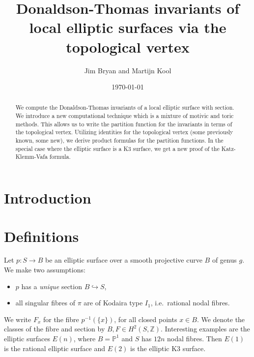 \documentclass{amsart}
\title{Donaldson-Thomas invariants of local elliptic surfaces via the topological vertex}
\author{Jim Bryan and Martijn Kool}
\date{\today}
\theoremstyle{definition}
\newcommand{\ZZ} {\mathbb{Z}}		%
\newcommand{\PP} {\mathbb{P}}
\begin{document}
\begin{abstract}

We compute the Donaldson-Thomas invariants of a local elliptic surface
with section. We introduce a new computational technique which is a
mixture of motivic and toric methods. This allows us to write the
partition function for the invariants in terms of the topological
vertex. Utilizing identities for the topological vertex (some
previously known, some new), we derive product formulas for the
partition functions. In the special case where the elliptic surface is
a K3 surface, we get a new proof of the Katz-Klemm-Vafa formula.
\end{abstract}

\maketitle 





\section{Introduction}

\section{Definitions}

Let $p : S \rightarrow B$ be an elliptic surface over a smooth projective curve $B$ of genus $g$. We make two assumptions:
\begin{itemize}
\item $p$ has a \emph{unique} section $B \hookrightarrow S$,
\item all singular fibres of $\pi$ are of Kodaira type $I_1$, i.e.~rational nodal fibres. 
\end{itemize}
We write $F_x$ for the fibre $p^{-1}(\{x\})$, for all closed points $x \in B$. We denote the classes of the fibre and section by $B, F \in H^2(S,\ZZ)$. Interesting examples are the elliptic surfaces $E(n)$, where $B = \PP^1$ and $S$ has $12n$ nodal fibres. Then $E(1)$ is the rational elliptic surface and $E(2)$ is the elliptic K3 surface.
\end{document}
